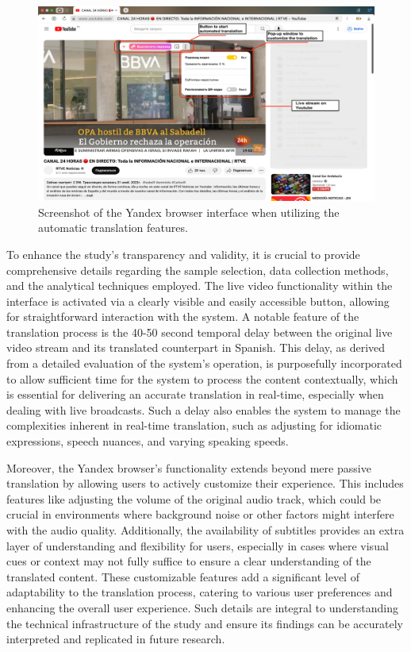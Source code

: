 \begin{figure}[htpb]
  \centering
  \begin{minipage}{\textwidth}
  \caption{Screenshot of the Yandex browser interface when utilizing 
  the automatic translation features.}
  \label{fig-01}
  \includegraphics[width=\textwidth]{image1.png}
  \end{minipage}
\end{figure}

To enhance the study's transparency and validity, it is
crucial to provide comprehensive details regarding the sample selection,
data collection methods, and the analytical techniques employed. The
live video functionality within the interface is activated via a clearly
visible and easily accessible button, allowing for straightforward
interaction with the system. A notable feature of the translation
process is the 40-50 second temporal delay between the original live
video stream and its translated counterpart in Spanish. This delay, as
derived from a detailed evaluation of the system's operation, is
purposefully incorporated to allow sufficient time for the system to
process the content contextually, which is essential for delivering an
accurate translation in real-time, especially when dealing with live
broadcasts. Such a delay also enables the system to manage the
complexities inherent in real-time translation, such as adjusting for
idiomatic expressions, speech nuances, and varying speaking speeds.

Moreover, the Yandex browser's functionality extends beyond mere passive
translation by allowing users to actively customize their experience.
This includes features like adjusting the volume of the original audio
track, which could be crucial in environments where background noise or
other factors might interfere with the audio quality. Additionally, the
availability of subtitles provides an extra layer of understanding and
flexibility for users, especially in cases where visual cues or context
may not fully suffice to ensure a clear understanding of the translated
content. These customizable features add a significant level of
adaptability to the translation process, catering to various user
preferences and enhancing the overall user experience. Such details are
integral to understanding the technical infrastructure of the study and
ensure its findings can be accurately interpreted and replicated in
future research.

